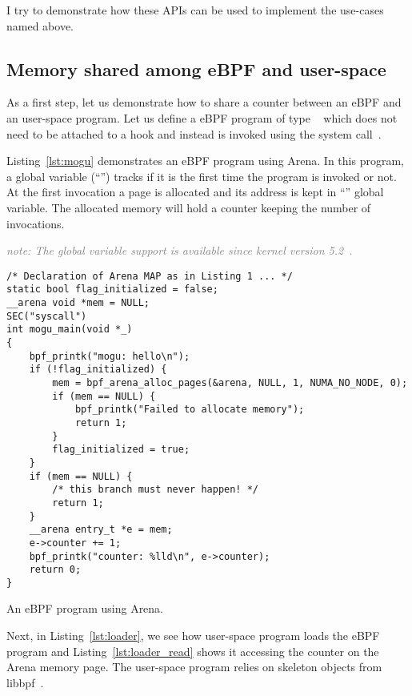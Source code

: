 \documentclass{article}
\begin{document}
I try to demonstrate how these APIs can be used to implement the use-cases
named above.

\subsection{Memory shared among eBPF and user-space}

As a first step, let us demonstrate how to share a counter between an eBPF
and an user-space program. Let us define a eBPF program of type
~\cite{ebpf_docs_prog_syscall} which does not need to
be attached to a hook and instead is invoked using the 
system call~\cite{ebpf_docs_bpf_prog_run}.

Listing~\ref{lst:mogu} demonstrates an eBPF program using Arena. In this
program, a global variable (``'') tracks if it is the first
time the program is invoked or not. At the first invocation a page is allocated
and its address is kept in ``'' global variable. The allocated memory
will hold a counter keeping the number of invocations.

\textcolor{gray}{\textit{note: The global variable support is available since
kernel version 5.2~\cite{glb_var_post}.}}

\begin{listing}
\begin{verbatim}
/* Declaration of Arena MAP as in Listing 1 ... */
static bool flag_initialized = false;
__arena void *mem = NULL;
SEC("syscall")
int mogu_main(void *_)
{
    bpf_printk("mogu: hello\n");
    if (!flag_initialized) {
        mem = bpf_arena_alloc_pages(&arena, NULL, 1, NUMA_NO_NODE, 0);
        if (mem == NULL) {
            bpf_printk("Failed to allocate memory");
            return 1;
        }
        flag_initialized = true;
    }
    if (mem == NULL) {
        /* this branch must never happen! */
        return 1;
    }
    __arena entry_t *e = mem;
    e->counter += 1;
    bpf_printk("counter: %lld\n", e->counter);
    return 0;
}
\end{verbatim}
\caption{An eBPF program using Arena.}
\label{lst:mogu}
\end{listing}

Next, in Listing~\ref{lst:loader}, we see how user-space program loads the eBPF
program and Listing~\ref{lst:loader_read} shows it accessing the counter on the
Arena memory page. The user-space program relies on skeleton objects from
libbpf~\cite{libbpf_skeleton}.
\end{document}
